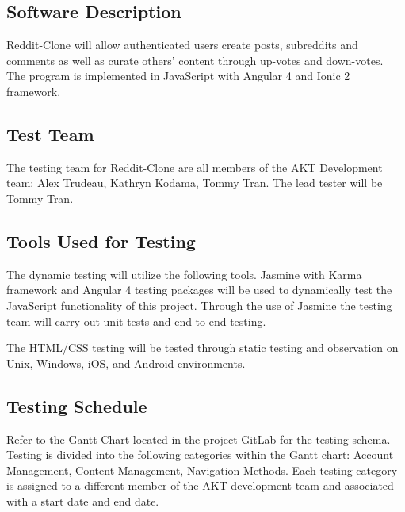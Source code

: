 \documentclass[12pt,fleqn]{article}
\begin{document}
\subsection {Software Description}
Reddit-Clone will allow authenticated users create posts, subreddits and comments as well as curate others' content through up-votes and down-votes.  The program is implemented in JavaScript with Angular 4 and Ionic 2 framework.

\subsection {Test Team}
The testing team for Reddit-Clone are all members of the AKT Development team: Alex Trudeau, Kathryn Kodama, Tommy Tran.  The lead tester will be Tommy Tran.

{\color{red}\subsection {Tools Used for Testing}
The dynamic testing will utilize the following tools.  Jasmine with Karma framework and Angular 4 testing packages will be used to dynamically test the JavaScript functionality of this project.  Through the use of Jasmine the testing team will carry out unit tests and end to end testing.

The HTML/CSS testing will be tested through static testing and observation on Unix, Windows, iOS, and Android environments.}

\subsection {Testing Schedule}

Refer to the \href{https://gitlab.cas.mcmaster.ca/trudeaua/reddit-clone}{Gantt Chart} located in the project GitLab for the testing schema.   Testing is divided into the following categories within the Gantt chart: Account Management, Content Management, Navigation Methods.  Each testing category is assigned to a different member of the AKT development team and associated with a start date and end date.
\end{document}

